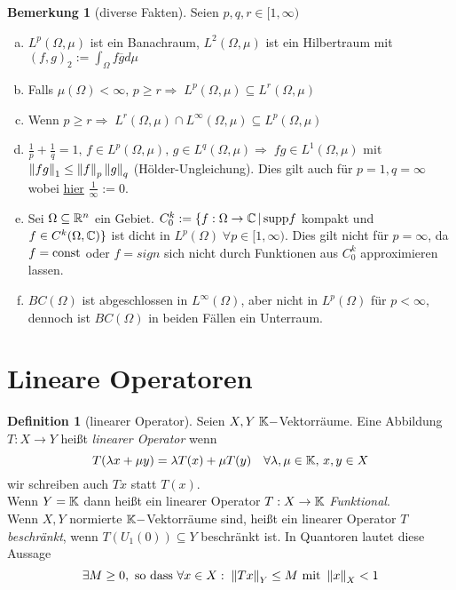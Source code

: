 \documentclass[ngerman]{report}
\theoremstyle{plain}%
\theoremstyle{definition}%
\newtheorem{definition}[thm]{Definition}
\theoremstyle{myStyle}
\newtheorem{bem}[thm]{Bemerkung}
\begin{document}
	\begin{bem}[diverse Fakten]
		Seien $p,q,r\in [1,\infty)$
		\begin{enumerate}[(a)]
			\item $L^p(\Omega,\mu)$ ist ein Banachraum, $L^2(\Omega,\mu)$ ist ein Hilbertraum mit $(f,g)_2 := \int_\Omega f \overline{g} d\mu$
			
			\item Falls $\mu(\Omega) < \infty,\, p\geq r \Rightarrow\; L^p(\Omega,\mu)\subseteq L^r(\Omega,\mu)$
			
			\item Wenn $p\geq r\Rightarrow\; L^r(\Omega,\mu)\cap L^\infty(\Omega,\mu)\subseteq L^p(\Omega,\mu)$
			
			\item $\frac{1}{p}+\frac{1}{q}=1,\,f\in L^p(\Omega,\mu),\,g\in L^q(\Omega,\mu)\Rightarrow\;fg\in 		 L^1(\Omega,\mu)$ mit $\left \|fg\right\|_1\leq\left \|f\right\|_p\left \|g\right\|_q$ (Hölder-Ungleichung). Dies gilt auch für $p=1, q=\infty$ wobei \underline{hier} $\frac{1}{\infty}:=0$.
			
			\item Sei $\Omega\subseteq \mathbb{R}^n$ ein Gebiet. $C^k_0:=\{f:\Omega \rightarrow \mathbb{C}\,|\, \textnormal{supp} f$ kompakt und $f\in C^k(\Omega,\mathbb{C})\}$ ist dicht in $L^p(\Omega)\;\forall p\in[1,\infty)$. Dies gilt nicht für $p=\infty$, da $f=\textnormal{const}$ oder $f=sign$ sich nicht durch Funktionen aus $C^k_0$ approximieren lassen.
			
			\item $BC(\Omega)$ ist abgeschlossen in $L^\infty (\Omega)$, aber nicht in $L^p(\Omega)$ für $p<\infty$, dennoch ist $BC(\Omega)$ in beiden Fällen ein Unterraum.
		\end{enumerate}
	\end{bem}



\section{Lineare Operatoren}

	\begin{definition}[linearer Operator]
		Seien $X,Y\; \mathbb{K}-$Vektorräume. Eine Abbildung $T:X\rightarrow Y$ heißt \textit{linearer Operator} wenn 
		$$T(\lambda x+\mu y) = \lambda T(x) + \mu T(y)\quad \forall \lambda,\mu \in \mathbb{K},\,x,y\in X$$ 
		wir schreiben auch $Tx$ statt $T(x)$.\\
		Wenn $Y=\mathbb{K}$ dann heißt ein linearer Operator $T:X\rightarrow \mathbb{K}$\textit{ Funktional}.\\
		Wenn $X,Y$ normierte $\mathbb{K}-$Vektorräume sind, heißt ein linearer Operator $T$ \textit{beschränkt}, wenn $T(U_1(0)) \subseteq Y$ beschränkt ist. In Quantoren lautet diese Aussage
			$$ \exists M \geq 0, \text{ so dass } \forall x\in X :\; \left \|Tx\right\|_Y \leq M \text{ mit } \left \|x\right\|_X < 1$$
	\end{definition}
\end{document}
